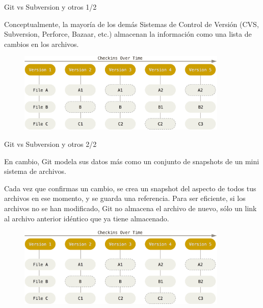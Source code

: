 \documentclass{beamer}
\begin{document}
\begin{frame}{Git vs Subversion y otros 1/2}

    Conceptualmente, la mayoría de los demás Sistemas de Control de Versión
    (CVS, Subversion, Perforce, Bazaar, etc.) almacenan la información
    como una lista de cambios en los archivos.

    \vspace{0.5em}

    \begin{figure}[ht]
        \begin{center}
            \includegraphics[height=1.5in]{images/git-data.png}
        \end{center}
    \end{figure}

\end{frame}

\begin{frame}{Git vs Subversion y otros 2/2}

     En cambio, Git modela sus datos más como un conjunto de snapshots de un mini sistema de archivos.

     \vspace{0.5em}

     Cada vez que confirmas un cambio, se crea un snapshot del aspecto de todos tus archivos en ese momento, y se guarda una referencia.
     Para ser eficiente, si los archivos no se han modificado, Git no almacena el archivo de nuevo, sólo
     un link al archivo anterior idéntico que ya tiene almacenado.

    \vspace{0.5em}

    \begin{figure}[ht]
        \begin{center}
            \includegraphics[height=1.5in]{images/git-data.png}
        \end{center}
    \end{figure}

\end{frame}
\end{document}
